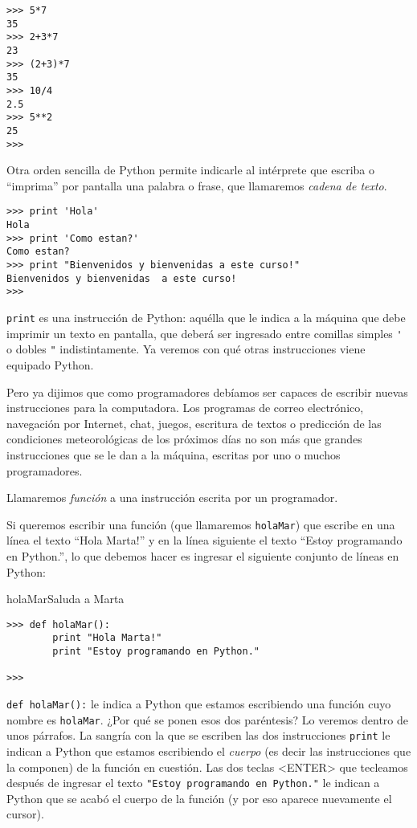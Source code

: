 \begin{lstlisting}[numbers=none]
>>> 5*7
35
>>> 2+3*7
23
>>> (2+3)*7
35
>>> 10/4
2.5
>>> 5**2
25
>>>
\end{lstlisting}

Otra orden sencilla de Python permite indicarle al intérprete que escriba o
``imprima'' por pantalla una palabra o frase, que llamaremos {\it cadena de
texto}.

\begin{lstlisting}[numbers=none]
>>> print 'Hola'
Hola
>>> print 'Como estan?'
Como estan?
>>> print "Bienvenidos y bienvenidas a este curso!"
Bienvenidos y bienvenidas  a este curso!
>>>
\end{lstlisting}

\lstinline+print+ es una instrucción de Python: aquélla que le indica a la
máquina que debe imprimir un texto en pantalla, que deberá ser ingresado entre
comillas simples \lstinline!'! o dobles \lstinline!"! indistintamente. Ya
veremos con qué otras instrucciones viene equipado Python.

Pero ya dijimos que como programadores debíamos ser capaces de
escribir nuevas instrucciones para la computadora. Los programas
de correo electrónico, navegación por Internet, chat, juegos,
escritura de textos o predicción de las condiciones meteorológicas de los
próximos días no son más que grandes instrucciones que se le dan a la
máquina, escritas por uno o muchos programadores.

Llamaremos {\it función} a una instrucción escrita por un
programador.

Si queremos escribir una función (que llamaremos \lstinline!holaMar!)
que escribe en una línea el texto ``Hola Marta!'' y en la línea
siguiente el texto ``Estoy programando en Python.'', lo que
debemos hacer es ingresar el siguiente conjunto de líneas en
Python:

\begin{codigo}{holaMar}{Saluda a Marta}
\begin{lstlisting}[numbers=none]
>>> def holaMar():
        print "Hola Marta!"
        print "Estoy programando en Python."

>>>
\end{lstlisting}
\end{codigo}

\lstinline!def holaMar():! le indica a Python que estamos escribiendo
una función cuyo nombre es \lstinline!holaMar!. ¿Por qué se ponen
esos dos paréntesis? Lo veremos dentro de unos párrafos. La
sangría con la que se escriben las dos instrucciones \lstinline+print+
le indican a Python que estamos escribiendo el {\it cuerpo} (es
decir las instrucciones que la componen) de la función en
cuestión. Las dos teclas <ENTER> \esp que tecleamos después de
ingresar el texto \lstinline+"Estoy programando en Python."+ le indican
a Python que se acabó el cuerpo de la función (y por eso aparece
nuevamente el cursor).

